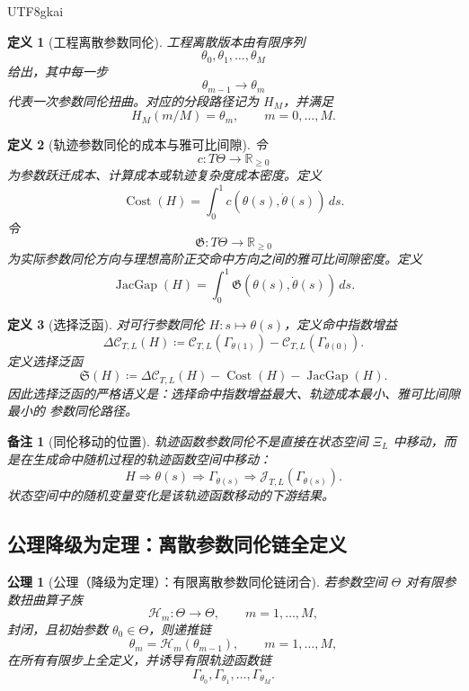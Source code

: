 \documentclass[12pt]{article}
\newtheorem{definition}{定义}[section]
\newtheorem{axiom}{公理}[section]
\newtheorem{remark}{备注}[section]
\newcommand{\RR}{\mathbb{R}}
\newcommand{\DefEq}{\coloneqq}
\DeclareMathOperator{\Cost}{Cost}
\DeclareMathOperator{\JacGap}{JacGap}
\begin{document}
\begin{CJK*}{UTF8}{gkai}
\begin{definition}[工程离散参数同伦]
\label{def:tex57-discrete-homotopy}
工程离散版本由有限序列
\[
  \theta_0,\theta_1,\ldots,\theta_M
\]
给出，其中每一步
\[
  \theta_{m-1}\to\theta_m
\]
代表一次参数同伦扭曲。对应的分段路径记为 \(H_M\)，并满足
\[
  H_M(m/M)=\theta_m,
  \qquad
  m=0,\ldots,M.
\]
\end{definition}

\begin{definition}[轨迹参数同伦的成本与雅可比间隙]
\label{def:tex57-cost-jacgap}
令
\[
  c:T\Theta\to\RR_{\ge0}
\]
为参数跃迁成本、计算成本或轨迹复杂度成本密度。定义
\[
  \Cost(H)
  =
  \int_0^1 c(\theta(s),\dot\theta(s))\,ds.
\]
令
\[
  \mathfrak G:T\Theta\to\RR_{\ge0}
\]
为实际参数同伦方向与理想高阶正交命中方向之间的雅可比间隙密度。定义
\[
  \JacGap(H)
  =
  \int_0^1
  \mathfrak G(\theta(s),\dot\theta(s))\,ds.
\]
\end{definition}

\begin{definition}[选择泛函]
\label{def:tex57-selection-functional}
对可行参数同伦 \(H:s\mapsto\theta(s)\)，定义命中指数增益
\[
  \Delta\mathcal C_{T,L}(H)
  \DefEq
  \mathcal C_{T,L}(\Gamma_{\theta(1)})
  -
  \mathcal C_{T,L}(\Gamma_{\theta(0)}).
\]
定义选择泛函
\[
  \boxed{
  \mathfrak S(H)
  \DefEq
  \Delta\mathcal C_{T,L}(H)
  -
  \Cost(H)
  -
  \JacGap(H).
  }
\]
因此选择泛函的严格语义是：选择命中指数增益最大、轨迹成本最小、雅可比间隙最小的
参数同伦路径。
\end{definition}

\begin{remark}[同伦移动的位置]
轨迹函数参数同伦不是直接在状态空间 \(\Xi_L\) 中移动，而是在生成命中随机过程的轨迹函数空间中移动：
\[
\boxed{
H
\Longrightarrow
\theta(s)
\Longrightarrow
\Gamma_{\theta(s)}
\Longrightarrow
\mathcal J_{T,L}(\Gamma_{\theta(s)}).
}
\]
状态空间中的随机变量变化是该轨迹函数移动的下游结果。
\end{remark}

\subsection{公理降级为定理：离散参数同伦链全定义}
\label{subsec:tex57-axiom-downgrade}

\begin{axiom}[公理（降级为定理）：有限离散参数同伦链闭合]
\label{ax:tex57-discrete-chain}
若参数空间 \(\Theta\) 对有限参数扭曲算子族
\[
  \mathscr H_m:\Theta\to\Theta,
  \qquad
  m=1,\ldots,M,
\]
封闭，且初始参数 \(\theta_0\in\Theta\)，则递推链
\[
  \theta_m=\mathscr H_m(\theta_{m-1}),
  \qquad
  m=1,\ldots,M,
\]
在所有有限步上全定义，并诱导有限轨迹函数链
\[
  \Gamma_{\theta_0},\Gamma_{\theta_1},\ldots,\Gamma_{\theta_M}.
\]
\end{axiom}


\end{CJK*}
\end{document}
